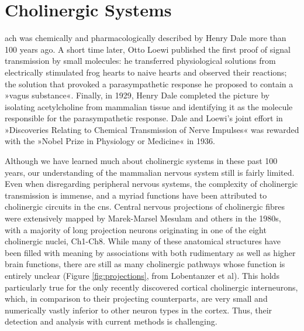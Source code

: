 
\section{Cholinergic Systems}
 \Ac{ach} was chemically and pharmacologically described by Henry Dale more than 100 years ago\cite{Dale1914}. A short time later, Otto Loewi published the first proof of signal transmission by small molecules: he transferred physiological solutions from electrically stimulated frog hearts to naive hearts and observed their reactions; the solution that provoked a parasympathetic response he proposed to contain a »vagus substance«\cite{Loewi1921}. Finally, in 1929, Henry Dale completed the picture by isolating acetylcholine from mammalian tissue and identifying it as the molecule responsible for the parasympathetic response\cite{Dale1929}. Dale and Loewi's joint effort in »Discoveries Relating to Chemical Transmission of Nerve Impulses« was rewarded with the »Nobel Prize in Physiology or Medicine« in 1936.

Although we have learned much about cholinergic systems in these past 100 years, our understanding of the mammalian nervous system still is fairly limited. Even when disregarding peripheral nervous systems, the complexity of cholinergic transmission is immense, and a myriad functions have been attributed to cholinergic circuits in the \ac{cns}. Central nervous projections of cholinergic fibres were extensively mapped by Marek-Marsel Mesulam and others in the 1980s\cite{Mesulam1984, Mesulam1988}, with a majority of long projection neurons originating in one of the eight cholinergic nuclei, Ch1-Ch8. While many of these anatomical structures have been filled with meaning by associations with both rudimentary as well as higher brain functions, there are still as many cholinergic pathways whose function is entirely unclear (Figure \ref{fig:projections}, from Lobentanzer et al\cite{Lobentanzer2019a}). This holds particularly true for the only recently discovered cortical cholinergic interneurons, which, in comparison to their projecting counterparts, are very small and numerically vastly inferior to other neuron types in the cortex. Thus, their detection and analysis with current methods is challenging. 

